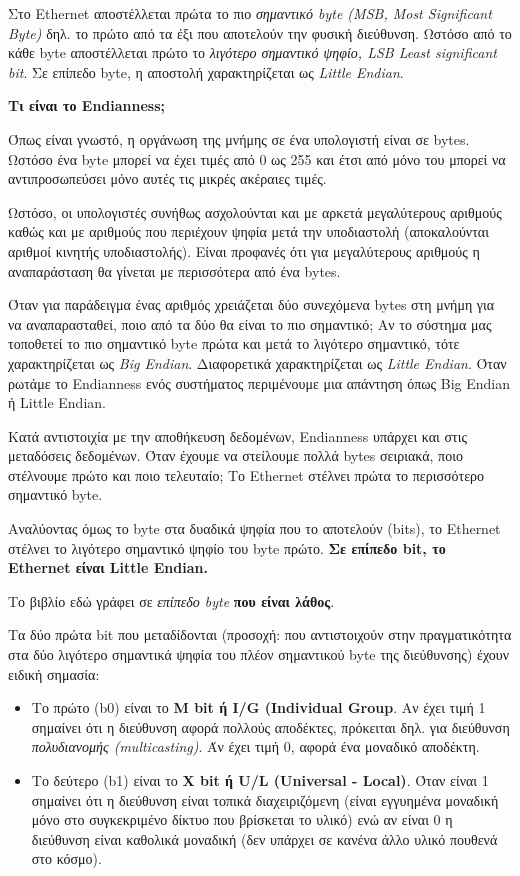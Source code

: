 Στο Ethernet αποστέλλεται πρώτα το πιο \emph{σημαντικό byte (MSB, Most Significant Byte)} δηλ. το πρώτο από τα έξι που αποτελούν την φυσική διεύθυνση. Ωστόσο από το κάθε byte αποστέλλεται πρώτο το \emph{λιγότερο σημαντικό ψηφίο, LSB Least significant bit}. Σε επίπεδο byte, η αποστολή χαρακτηρίζεται ως \emph{Little Endian}.

\begin{inthebox}
\textbf{Τι είναι το Endianness;}

Όπως είναι γνωστό, η οργάνωση της μνήμης σε ένα υπολογιστή είναι σε bytes. Ωστόσο ένα byte μπορεί να έχει τιμές από 0 ως 255 και έτσι από μόνο του μπορεί να αντιπροσωπεύσει μόνο αυτές τις μικρές ακέραιες τιμές.

Ωστόσο, οι υπολογιστές συνήθως ασχολούνται και με αρκετά μεγαλύτερους αριθμούς καθώς και με αριθμούς που περιέχουν ψηφία μετά την υποδιαστολή (αποκαλούνται αριθμοί κινητής υποδιαστολής). Είναι προφανές ότι για μεγαλύτερους αριθμούς η αναπαράσταση θα γίνεται με περισσότερα από ένα bytes.

Όταν για παράδειγμα ένας αριθμός χρειάζεται δύο συνεχόμενα bytes στη μνήμη για να αναπαρασταθεί, ποιο από τα δύο θα είναι το πιο σημαντικό; Αν το σύστημα μας τοποθετεί το πιο σημαντικό byte πρώτα και μετά το λιγότερο σημαντικό, τότε χαρακτηρίζεται ως \emph{Big Endian}. Διαφορετικά χαρακτηρίζεται ως \emph{Little Endian}. Όταν ρωτάμε το Endianness ενός συστήματος περιμένουμε μια απάντηση όπως Big Endian ή Little Endian.

Κατά αντιστοιχία με την αποθήκευση δεδομένων, Endianness υπάρχει και στις μεταδόσεις δεδομένων. Όταν έχουμε να στείλουμε πολλά bytes σειριακά, ποιο στέλνουμε πρώτο και ποιο τελευταίο; Tο Ethernet στέλνει πρώτα το περισσότερο σημαντικό byte.

Αναλύοντας όμως το byte στα δυαδικά ψηφία που το αποτελούν (bits), το Ethernet στέλνει το λιγότερο σημαντικό ψηφίο του byte πρώτο. \textbf{Σε επίπεδο bit, το Ethernet είναι Little Endian.}

Το βιβλίο εδώ γράφει σε \emph{επίπεδο byte} \textbf{που είναι λάθος}.\\
\end{inthebox}

Τα δύο πρώτα bit που μεταδίδονται (προσοχή: που αντιστοιχούν στην πραγματικότητα στα δύο λιγότερο σημαντικά ψηφία του πλέον σημαντικού byte της διεύθυνσης) έχουν ειδική σημασία:

\begin{itemize}
\item Το πρώτο (b0) είναι το \textbf{M bit ή I/G (Individual Group}. Αν έχει τιμή 1 σημαίνει ότι η διεύθυνση αφορά πολλούς αποδέκτες, πρόκειται δηλ. για διεύθυνση \emph{πολυδιανομής (multicasting)}. Άν έχει τιμή 0, αφορά ένα μοναδικό αποδέκτη.
\item Το δεύτερο (b1) είναι το \textbf{X bit ή U/L (Universal - Local)}. Όταν είναι 1 σημαίνει ότι η διεύθυνση είναι τοπικά διαχειριζόμενη (είναι εγγυημένα μοναδική μόνο στο συγκεκριμένο δίκτυο που βρίσκεται το υλικό) ενώ αν είναι 0 η διεύθυνση είναι καθολικά μοναδική (δεν υπάρχει σε κανένα άλλο υλικό πουθενά στο κόσμο).
\end{itemize}


